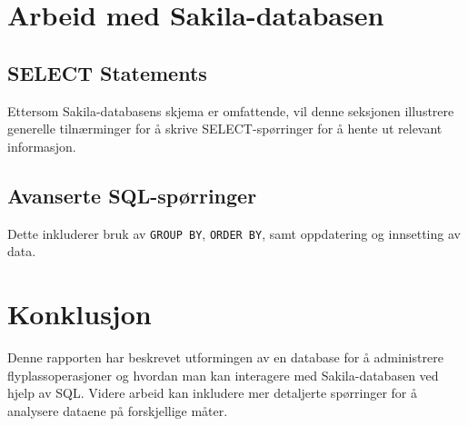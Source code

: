 \documentclass{article}
\begin{document}
\section{Arbeid med Sakila-databasen}

\subsection{SELECT Statements}
Ettersom Sakila-databasens skjema er omfattende, vil denne seksjonen illustrere generelle tilnærminger for å skrive SELECT-spørringer for å hente ut relevant informasjon.

\subsection{Avanserte SQL-spørringer}
Dette inkluderer bruk av \texttt{GROUP BY}, \texttt{ORDER BY}, samt oppdatering og innsetting av data.

\section{Konklusjon}
Denne rapporten har beskrevet utformingen av en database for å administrere flyplassoperasjoner og hvordan man kan interagere med Sakila-databasen ved hjelp av SQL. Videre arbeid kan inkludere mer detaljerte spørringer for å analysere dataene på forskjellige måter.
\end{document}
